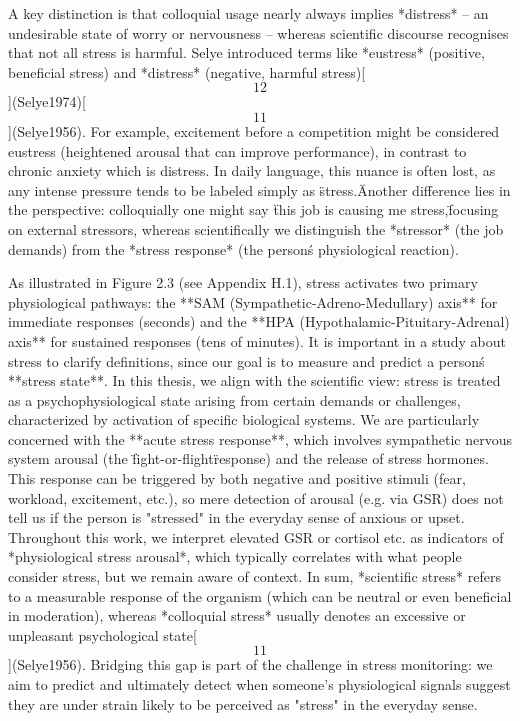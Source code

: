 \documentclass[12pt,a4paper]{article}
\begin{document}
A key distinction is that colloquial usage nearly always implies
*distress* -- an undesirable state of worry or nervousness -- whereas
scientific discourse recognises that not all stress is harmful. Selye
introduced terms like *eustress* (positive, beneficial stress) and
*distress* (negative, harmful
stress)[\[12\]](Selye1974)[\[11\]](Selye1956).
For example, excitement before a competition might be considered
eustress (heightened arousal that can improve performance), in contrast
to chronic anxiety which is distress. In daily language, this nuance is
often lost, as any intense pressure tends to be labeled simply as
\"stress.\" Another difference lies in the perspective: colloquially one
might say \"this job is causing me stress,\" focusing on external
stressors, whereas scientifically we distinguish the *stressor* (the job
demands) from the *stress response* (the person\'s physiological
reaction).

As illustrated in Figure 2.3 (see Appendix H.1), stress activates two primary physiological pathways: the **SAM (Sympathetic-Adreno-Medullary) axis** for immediate responses (seconds) and the **HPA (Hypothalamic-Pituitary-Adrenal) axis** for sustained responses (tens of minutes). It is important in a study about stress to clarify definitions, since
our goal is to measure and predict a person\'s **stress state**. In this
thesis, we align with the scientific view: stress is treated as a
psychophysiological state arising from certain demands or challenges,
characterized by activation of specific biological systems. We are
particularly concerned with the **acute stress response**, which
involves sympathetic nervous system arousal (the \"fight-or-flight\"
response) and the release of stress hormones. This response can be
triggered by both negative and positive stimuli (fear, workload,
excitement, etc.), so mere detection of arousal (e.g. via GSR) does not
tell us if the person is "stressed" in the everyday sense of anxious or
upset. Throughout this work, we interpret elevated GSR or cortisol etc.
as indicators of *physiological stress arousal*, which typically
correlates with what people consider stress, but we remain aware of
context. In sum, *scientific stress* refers to a measurable response of
the organism (which can be neutral or even beneficial in moderation),
whereas *colloquial stress* usually denotes an excessive or unpleasant
psychological
state[\[11\]](Selye1956).
Bridging this gap is part of the challenge in stress monitoring: we aim
to predict and ultimately detect when someone's physiological signals
suggest they are under strain likely to be perceived as "stress" in the
everyday sense.
\end{document}
